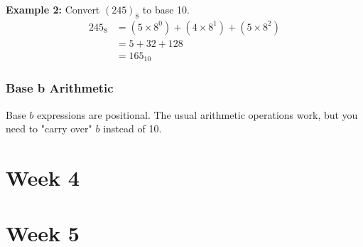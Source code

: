 \documentclass[12pt]{article}
\theoremstyle{definition}
\begin{document}
    \textbf{Example 2:} Convert $(245)_8$ to base 10.
    \begin{align*}
        245_8 &= (5 \times 8^0) + (4 \times 8^1) + (5 \times 8^2) \\
        &= 5 + 32 + 128 \\
        &= 165_{10}
    \end{align*}

    \subsubsection{Base b Arithmetic}
    Base $b$ expressions are positional. The usual arithmetic operations work, but you
    need to "carry over" $b$ instead of 10.

    \newpage
    \section{Week 4}

    \newpage
    \section{Week 5}
    
\end{document}
